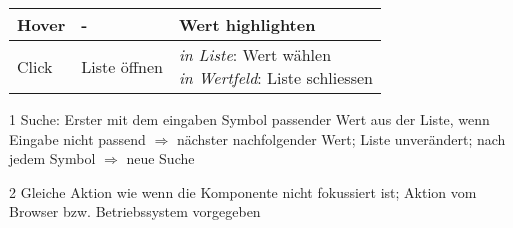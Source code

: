 \begin{table}[!htb]
\begin{threeparttable}
{\begin{tabular}{ l || l | l }
                Hover      & -                & Wert highlighten \\
                \hline
                Click      & Liste öffnen     & \tbbr{\emph{in Liste}: Wert wählen \\
                                                    \emph{in Wertfeld}: Liste schliessen} \\
                \hline
            \end{tabular}
        }
        \begin{tablenotes}
            \scriptsize
            \item[1] Suche: Erster mit dem eingaben Symbol passender Wert aus der Liste, wenn Eingabe nicht passend $\Rightarrow$ nächster nachfolgender Wert; 
                            Liste unverändert; nach jedem Symbol $\Rightarrow$ neue Suche
            \item[2] Gleiche Aktion wie wenn die Komponente nicht fokussiert ist; Aktion vom Browser bzw. Betriebssystem vorgegeben
        \end{tablenotes}
    \end{threeparttable}
\end{table}
